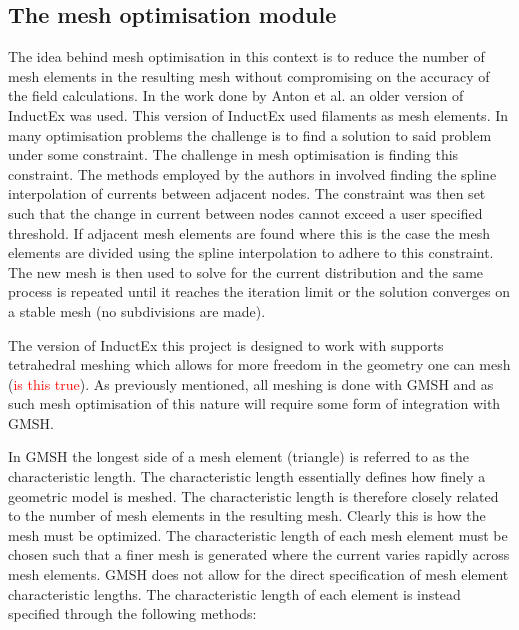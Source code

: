\subsection{The mesh optimisation module}
The idea behind mesh optimisation in this context is to reduce the number of mesh elements in the resulting mesh without compromising on the accuracy of the field calculations. In the work done by Anton et al. \cite{fluxNoiseSquidsStevenAnton} an older version of InductEx was used. This version of InductEx used filaments as mesh elements. In many optimisation problems the challenge is to find a solution to said problem under some constraint. The challenge in mesh optimisation is finding this constraint. The methods employed by the authors in \cite{fluxNoiseSquidsStevenAnton} involved finding the spline interpolation of currents between adjacent nodes. The constraint was then set such that the change in current between nodes cannot exceed a user specified threshold. If adjacent mesh elements are found where this is the case the mesh elements are divided using the spline interpolation to adhere to this constraint. The new mesh is then used to solve for the current distribution and the same process is repeated until it reaches the iteration limit or the solution converges on a stable mesh (no subdivisions are made). \par
The version of InductEx this project is designed to work with supports tetrahedral meshing which allows for more freedom in the geometry one can mesh (\textcolor{red}{is this true}). As previously mentioned, all meshing is done with GMSH and as such mesh optimisation of this nature will require some form of integration with GMSH. \par
In GMSH the longest side of a mesh element (triangle) is referred to as the characteristic length. The characteristic length essentially defines how finely a geometric model is meshed. The characteristic length is therefore closely related to the number of mesh elements in the resulting mesh. Clearly this is how the mesh must be optimized. The characteristic length of each mesh element must be chosen such that a finer mesh is generated where the current varies rapidly across mesh elements. GMSH does not allow for the direct specification of mesh element characteristic lengths. The characteristic length of each element is instead specified through the following methods: 

